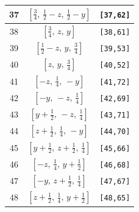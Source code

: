 \documentclass[fleqn,8pt]{jsarticle}
\begin{document}
\begin{longtable}{ccc}
37 & $\left[ \frac{3}{4},\, \frac{1}{2} - z,\, \frac{1}{2} - y \right]$ & {\tt [37,62]} \\ \hline
38 & $\left[ \frac{3}{4},\, z,\, y \right]$ & {\tt [38,61]} \\ \hline
39 & $\left[ \frac{1}{2} - z,\, y,\, \frac{3}{4} \right]$ & {\tt [39,53]} \\ \hline
40 & $\left[ z,\, y,\, \frac{3}{4} \right]$ & {\tt [40,52]} \\ \hline
41 & $\left[ - z,\, \frac{1}{4},\, - y \right]$ & {\tt [41,72]} \\ \hline
42 & $\left[ - y,\, - z,\, \frac{1}{4} \right]$ & {\tt [42,69]} \\ \hline
43 & $\left[ y + \frac{1}{2},\, - z,\, \frac{1}{4} \right]$ & {\tt [43,71]} \\ \hline
44 & $\left[ z + \frac{1}{2},\, \frac{1}{4},\, - y \right]$ & {\tt [44,70]} \\ \hline
45 & $\left[ y + \frac{1}{2},\, z + \frac{1}{2},\, \frac{1}{4} \right]$ & {\tt [45,66]} \\ \hline
46 & $\left[ - z,\, \frac{1}{4},\, y + \frac{1}{2} \right]$ & {\tt [46,68]} \\ \hline
47 & $\left[ - y,\, z + \frac{1}{2},\, \frac{1}{4} \right]$ & {\tt [47,67]} \\ \hline
48 & $\left[ z + \frac{1}{2},\, \frac{1}{4},\, y + \frac{1}{2} \right]$ & {\tt [48,65]} \\
\end{longtable}
\renewcommand{\arraystretch}{1.2}
\end{document}
